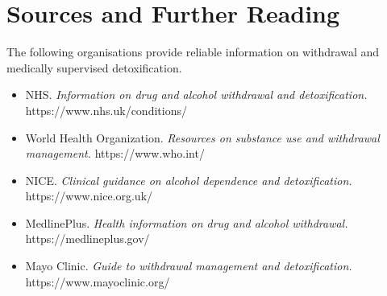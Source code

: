 \section*{Sources and Further Reading}
The following organisations provide reliable information on withdrawal and medically supervised detoxification.

\begin{itemize}
    \item NHS. \textit{Information on drug and alcohol withdrawal and detoxification.} https://www.nhs.uk/conditions/
    \item World Health Organization. \textit{Resources on substance use and withdrawal management.} https://www.who.int/
    \item NICE. \textit{Clinical guidance on alcohol dependence and detoxification.} https://www.nice.org.uk/
    \item MedlinePlus. \textit{Health information on drug and alcohol withdrawal.} https://medlineplus.gov/
    \item Mayo Clinic. \textit{Guide to withdrawal management and detoxification.} https://www.mayoclinic.org/
\end{itemize}
